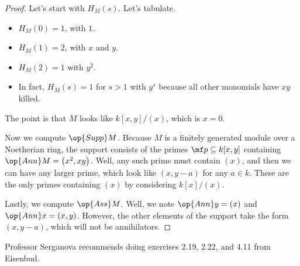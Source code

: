 \begin{proof}
	Let's start with $H_M(s)$. Let's tabulate.
	\begin{itemize}
		\item $H_M(0)=1$, with $1$.
		\item $H_M(1)=2$, with $x$ and $y$.
		\item $H_M(2)=1$ with $y^2$.
		\item In fact, $H_M(s)=1$ for $s>1$ with $y^s$ because all other monomials have $xy$ killed.
	\end{itemize}
	The point is that $M$ looks like $k[x,y]/(x)$, which is $x=0$.

	Now we compute $\op{Supp}M$. Because $M$ is a finitely generated module over a Noetherian ring, the support consists of the primes $\mf p\subseteq k[x,y]$ containing $\op{Ann}M=\left(x^2,xy\right)$. Well, any such prime must contain $(x)$, and then we can have any larger prime, which look like $(x,y-a)$ for any $a\in k$. These are the only primes containing $(x)$ by considering $k[x]/(x)$.

	Lastly, we compute $\op{Ass}M$. Well, we note $\op{Ann}y=(x)$ and $\op{Ann}x=(x,y)$. However, the other elements of the support take the form $(x,y-a)$, which will not be annihilators.
\end{proof}
\begin{remark}
	Professor Serganova recommends doing exercises 2.19, 2.22, and 4.11 from Eisenbud.
\end{remark}